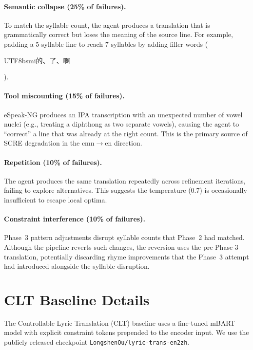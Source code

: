 \documentclass[11pt]{article}
\begin{document}
\paragraph{Semantic collapse (25\% of failures).}
To match the syllable count, the agent produces a translation that is grammatically correct but loses the meaning of the source line.
For example, padding a 5-syllable line to reach 7 syllables by adding filler words (\begin{CJK}{UTF8}{bsmi}的、了、啊\end{CJK}).

\paragraph{Tool miscounting (15\% of failures).}
eSpeak-NG produces an IPA transcription with an unexpected number of vowel nuclei (e.g., treating a diphthong as two separate vowels), causing the agent to ``correct'' a line that was already at the right count.
This is the primary source of SCRE degradation in the cmn$\to$en direction.

\paragraph{Repetition (10\% of failures).}
The agent produces the same translation repeatedly across refinement iterations, failing to explore alternatives.
This suggests the temperature (0.7) is occasionally insufficient to escape local optima.

\paragraph{Constraint interference (10\% of failures).}
Phase~3 pattern adjustments disrupt syllable counts that Phase~2 had matched.
Although the pipeline reverts such changes, the reversion uses the pre-Phase-3 translation, potentially discarding rhyme improvements that the Phase~3 attempt had introduced alongside the syllable disruption.

\section{CLT Baseline Details}
\label{app:clt}

The Controllable Lyric Translation (CLT) baseline \citep{ou-etal-2023-songs} uses a fine-tuned mBART model with explicit constraint tokens prepended to the encoder input.
We use the publicly released checkpoint \texttt{LongshenOu/lyric-trans-en2zh}.
\end{document}
